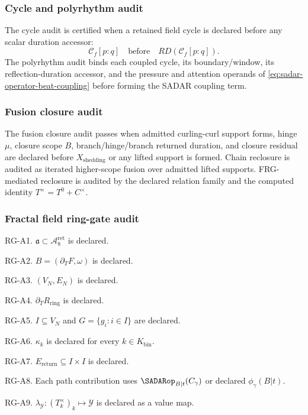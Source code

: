 \subsubsection{Cycle and polyrhythm audit}\label{subsec:cycle-polyrhythm-audit}
The cycle audit is certified when a retained field cycle is declared before any scalar duration accessor:
\[
\mathcal C_f[p{:}q]
\quad\text{before}\quad
RD\!\left(\mathcal C_f[p{:}q]\right).
\]
The polyrhythm audit binds each coupled cycle, its boundary/window,
its reflection-duration accessor, and the pressure and attention operands
of \eqref{eq:sadar-operator-beat-coupling} before forming the SADAR coupling term.


\subsubsection{Fusion closure audit}\label{subsec:fusion-closure-audit}
The fusion closure audit passes when admitted curling-curl support forms, hinge \(\mu\), closure scope \(B\), branch/hinge/branch returned duration, and closure residual are declared before \(X_{\mathrm{shedding}}\) or any lifted support is formed. Chain reclosure is audited as iterated higher-scope fusion over admitted lifted supports. FRG-mediated reclosure is audited by the declared relation family and the computed identity \(T^\times=T^0+C^\times\).

\subsubsection{Fractal field ring-gate audit}\label{subsec:fractal-field-ring-gate-audit}
RG-A1. \(\mathfrak a\subset \mathcal A^{\mathrm{ret}}_8\) is declared.

RG-A2. \(B=(\partial_TF,\omega)\) is declared.

RG-A3. \((V_N,E_N)\) is declared.

RG-A4. \(\partial_T R_{\mathrm{ring}}\) is declared.

RG-A5. \(I\subseteq V_N\) and \(G=\{g_i:i\in I\}\) are declared.

RG-A6. \(\kappa_k\) is declared for every \(k\in K_{\mathrm{bin}}\).

RG-A7. \(E_{\mathrm{return}}\subseteq I\times I\) is declared.

RG-A8. Each path contribution uses \(\SADARop_{B|t}(C_\gamma)\) or declared \(\phi_\gamma(B|t)\).

RG-A9. \(\lambda_{\mathcal Y}:(T_k^\times)_k\mapsto\mathcal Y\) is declared as a value map.

